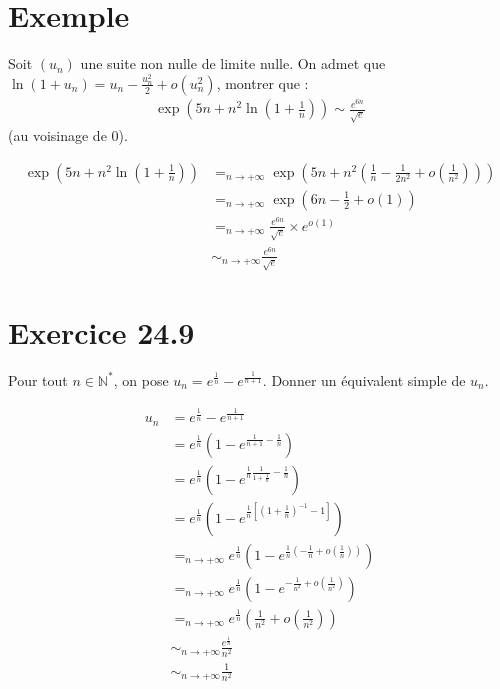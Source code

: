 \documentclass[../main.tex]{subfiles}
\begin{document}
\section{Exemple}
\begin{tcolorbox}[title=Exemple 24.46, title filled=false, colframe=darkgreen, colback=darkgreen!10!white]
    Soit $(u_n)$ une suite non nulle de limite nulle. On admet que $\ln (1 + u_n) = u_n - \frac{u_n^2}{2} + o(u_n^2)$, montrer que : 
    \begin{align*}
        \exp \left(5n + n^2\ln \left(1 + \frac{1}{n}\right)\right) \sim \frac{e^{6n}}{\sqrt{e}}
    \end{align*}
    (au voisinage de $0$).
\end{tcolorbox}

\begin{align*}
    \exp \left(5n + n^2 \ln \left(1 + \frac{1}{n}\right)\right) &=_{n\to +\infty} \exp \left(5n + n^2 \left(\frac{1}{n} - \frac{1}{2n^2} + o\left(\frac{1}{n^2}\right)\right)\right) \\
    &=_{n\to +\infty} \exp \left(6n - \frac{1}{2} + o(1)\right) \\
    &=_{n\to +\infty} \frac{e^{6n}}{\sqrt{e}} \times e^{o(1)} \\
    &\sim_{n\to +\infty} \frac{e^{6n}}{\sqrt{e}}
\end{align*}

\section*{Exercice 24.9}
\begin{tcolorbox}[title=Exercice 24.9, title filled=false, colframe=darkgreen, colback=darkgreen!10!white]
    Pour tout $n\in \mathbb{N}^*$, on pose $u_n = e^{\frac{1}{n}} - e^{\frac{1}{n+1}}$. Donner un équivalent simple de $u_n$. 
\end{tcolorbox}

\begin{align*}
    u_n &= e^{\frac{1}{n}} - e^{\frac{1}{n+1}} \\
    &= e^{\frac{1}{n}} (1 - e^{\frac{1}{n+1} -\frac{1}{n}}) \\
    &= e^{\frac{1}{n}} (1 - e^{\frac{1}{n} \frac{1}{1 + \frac{1}{n}} - \frac{1}{n}}) \\
    &= e^{\frac{1}{n}} (1 - e^{\frac{1}{n}\left[ (1 + \frac{1}{n})^{-1} - 1 \right]}) \\
    &=_{n\to +\infty} e^{\frac{1}{n}} (1 - e^{\frac{1}{n} \left(-\frac{1}{n} + o\left(\frac{1}{n}\right)\right)}) \\
    &=_{n\to +\infty} e^{\frac{1}{n}}(1 - e^{-\frac{1}{n^2} + o \left(\frac{1}{n^2}\right)}) \\
    &=_{n\to +\infty} e^{\frac{1}{n}}(\frac{1}{n^2} + o \left(\frac{1}{n^2}\right)) \\
    &\sim_{n\to +\infty} \frac{e^{\frac{1}{n}}}{n^2} \\
    &\sim_{n\to +\infty} \frac{1}{n^2}
\end{align*}
\end{document}
